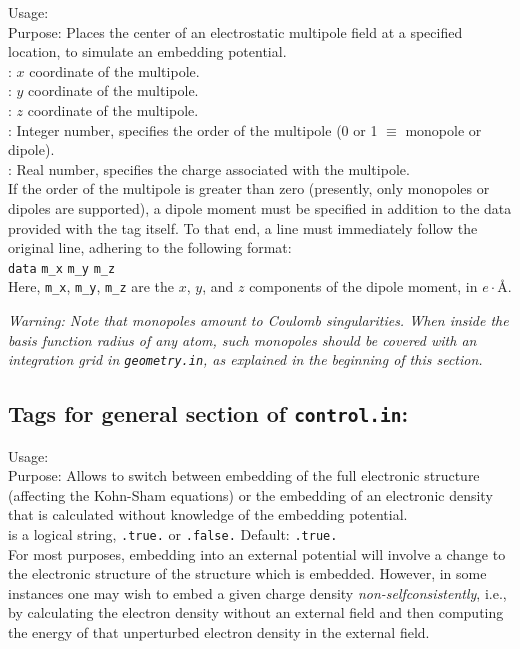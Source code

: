 {
  \noindent
  Usage:    
      \\[1.0ex] 
  Purpose: Places the center of an electrostatic multipole field at a
    specified location, to simulate an embedding potential. \\[1.0ex]
   : $x$ coordinate of the multipole. \\
   : $y$ coordinate of the multipole. \\
   : $z$ coordinate of the multipole. \\
   : Integer number, specifies the order of the
    multipole (0 or 1 $\equiv$ monopole or dipole). \\
   : Real number, specifies the charge associated with
    the multipole. \\
}
If the order of the multipole is greater than zero (presently, only
 monopoles or dipoles are supported), a dipole moment must be 
specified in addition to the data provided with the
 tag itself. To that end, a line must
immediately follow the original  line, adhering to
the following format: \\[1.0ex]
  \texttt{data} \texttt{m\_x} \texttt{m\_y} \texttt{m\_z}
\\[1.0ex]
Here, \texttt{m\_x}, \texttt{m\_y}, \texttt{m\_z} are the $x$, $y$,
and $z$ components of the dipole moment, in $e\cdot${\AA}. 

\emph{Warning: Note that monopoles amount to Coulomb singularities. When
  inside the basis function radius of any atom, such monopoles should
  be covered with an integration grid in \texttt{geometry.in}, as
  explained in the beginning of this section.}

\newpage

\subsection*{Tags for general section of \texttt{control.in}:}

{
  \noindent
  Usage:   \\[1.0ex]
  Purpose: Allows to switch between embedding of the full electronic
    structure (affecting the Kohn-Sham equations) or the embedding of
    an electronic density that is calculated without knowledge of the 
    embedding potential. \\[1.0ex]
   is a logical string, \texttt{.true.} or
    \texttt{.false.} Default: \texttt{.true.} \\
}
For most purposes, embedding into an external potential will involve a
change to the electronic structure of the structure which is
embedded. However, in some instances one may wish to embed a given
charge density \emph{non-selfconsistently}, i.e., by calculating the
electron density without an external field and then computing the
energy of that unperturbed electron density in the external field.

